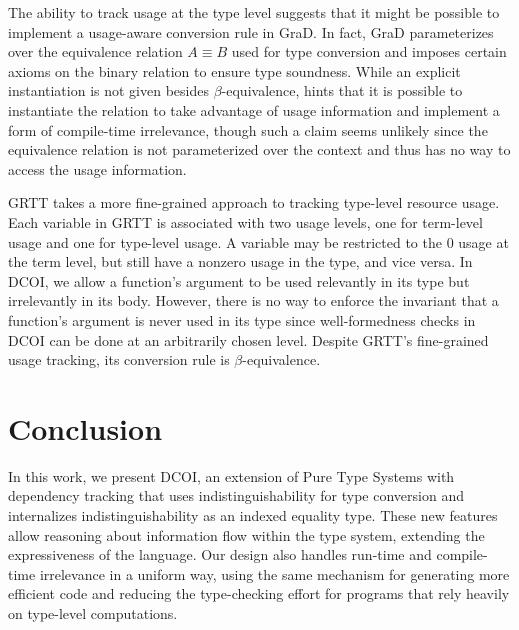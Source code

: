 \documentclass[acmsmall]{acmart}
\newcommand{\scw}[1]{}
\newcommand{\yl}[1]{}
\newcommand{\name}{DCOI\xspace}
\begin{document}
\ifextended
The ability to track usage at the type level suggests that it might be
possible to implement a usage-aware conversion rule in GraD. In fact,
GraD parameterizes over the equivalence relation $A \equiv B$ used for type
conversion and imposes certain axioms on the binary relation to ensure
type soundness.
While an explicit instantiation is not given besides
$\beta$-equivalence, \citet{weirich:graded-haskell} hints that it is
possible to instantiate the relation to take advantage of usage
information and implement a form of compile-time irrelevance, though
such a claim seems unlikely since the equivalence relation is not
parameterized over the context and thus has no way to access the usage information.
\scw{I'm not sure that I would make this claim today. I don't believe GraD can 
  support compile-time irrelevance any more.}
\yl{I put the entire paragraph to extended. When you say ``I don't believe GraD can 
  support compile-time irrelevance any more.'' is it because the relation is binary and is not indexed by the context?}
\fi

GRTT takes a more fine-grained approach to tracking type-level resource
usage. Each variable in GRTT is associated with two usage levels, one for
term-level usage and one for type-level usage. A variable may be restricted to
the $0$ usage at the term level, but still have a nonzero usage in the type,
and vice versa. In \name{}, we allow a function's argument to be used
relevantly in its type but irrelevantly in its body. However, there is no
way to enforce the invariant that a function's argument is never used in
its type since well-formedness checks in \name{} can be done at an
arbitrarily chosen level.
Despite GRTT's fine-grained usage tracking, its conversion rule is 
$\beta$-equivalence. %

\section{Conclusion}
In this work, we present \name{}, an extension of Pure Type Systems
with dependency tracking that uses indistinguishability for
type conversion and internalizes indistinguishability as an indexed
equality type. These new features allow reasoning about
information flow within the type system,
extending the expressiveness of the language.
Our design also handles run-time and compile-time irrelevance
in a uniform way, using the same mechanism for
generating more efficient code and reducing the type-checking effort for
programs that rely heavily on type-level computations. 
\end{document}
